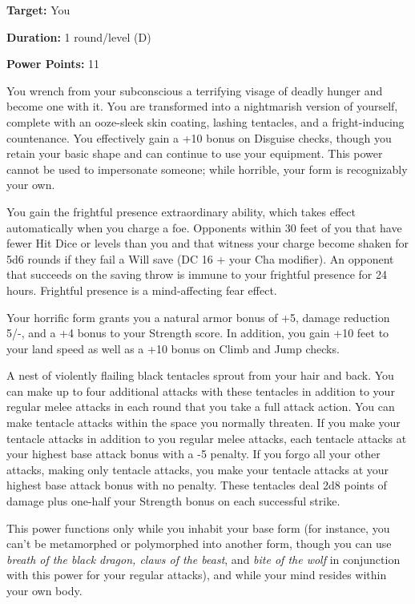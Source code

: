 \documentclass{article}
\begin{document}
\textbf{Target:} You

\textbf{Duration:} 1 round/level (D)

\textbf{Power Points:} 11

You wrench from your subconscious a terrifying visage of deadly hunger and become 
one with it. You are transformed into a nightmarish version of yourself, complete 
with an ooze-sleek skin coating, lashing tentacles, and a fright-inducing countenance. 
You effectively gain a +10 bonus on Disguise checks, though you retain your basic 
shape and can continue to use your equipment. This power cannot be used to impersonate 
someone; while horrible, your form is recognizably your own.

You gain the frightful presence extraordinary ability, which takes effect automatically 
when you charge a foe. Opponents within 30 feet of you that have fewer Hit Dice 
or levels than you and that witness your charge become shaken for 5d6 rounds if 
they fail a Will save (DC 16 + your Cha modifier). An opponent that succeeds on 
the saving throw is immune to your frightful presence for 24 hours. Frightful presence 
is a mind-affecting fear effect.

Your horrific form grants you a natural armor bonus of +5, damage reduction 5/-, 
and a +4 bonus to your Strength score. In addition, you gain +10 feet to your land 
speed as well as a +10 bonus on Climb and Jump checks.

A nest of violently flailing black tentacles sprout from your hair and back. You 
can make up to four additional attacks with these tentacles in addition to your 
regular melee attacks in each round that you take a full attack action. You can 
make tentacle attacks within the space you normally threaten. If you make your 
tentacle attacks in addition to you regular melee attacks, each tentacle attacks 
at your highest base attack bonus with a -5 penalty. If you forgo all your other 
attacks, making only tentacle attacks, you make your tentacle attacks at your highest 
base attack bonus with no penalty. These tentacles deal 2d8 points of damage plus 
one-half your Strength bonus on each successful strike.

This power functions only while you inhabit your base form (for instance, you can't 
be metamorphed or polymorphed into another form, though you can use \textit{breath 
of the black dragon, claws of the beast}, and \textit{bite of the wolf }in conjunction 
with this power for your regular attacks), and while your mind resides within your 
own body.
\end{document}
